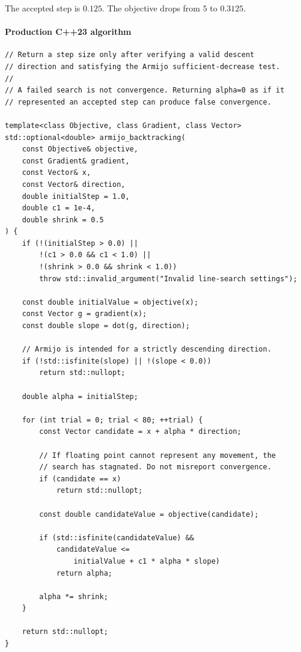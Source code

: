 The accepted step is \(0.125\). The objective drops from \(5\) to \(0.3125\).

\paragraph{Production C++23 algorithm}\label{02-foundations-ii-ch026-production-c23-algorithm}

\hypertarget{02-foundations-ii-ch026-production-c23-algorithm}{}

\begin{verbatim}
// Return a step size only after verifying a valid descent
// direction and satisfying the Armijo sufficient-decrease test.
//
// A failed search is not convergence. Returning alpha=0 as if it
// represented an accepted step can produce false convergence.

template<class Objective, class Gradient, class Vector>
std::optional<double> armijo_backtracking(
    const Objective& objective,
    const Gradient& gradient,
    const Vector& x,
    const Vector& direction,
    double initialStep = 1.0,
    double c1 = 1e-4,
    double shrink = 0.5
) {
    if (!(initialStep > 0.0) ||
        !(c1 > 0.0 && c1 < 1.0) ||
        !(shrink > 0.0 && shrink < 1.0))
        throw std::invalid_argument("Invalid line-search settings");

    const double initialValue = objective(x);
    const Vector g = gradient(x);
    const double slope = dot(g, direction);

    // Armijo is intended for a strictly descending direction.
    if (!std::isfinite(slope) || !(slope < 0.0))
        return std::nullopt;

    double alpha = initialStep;

    for (int trial = 0; trial < 80; ++trial) {
        const Vector candidate = x + alpha * direction;

        // If floating point cannot represent any movement, the
        // search has stagnated. Do not misreport convergence.
        if (candidate == x)
            return std::nullopt;

        const double candidateValue = objective(candidate);

        if (std::isfinite(candidateValue) &&
            candidateValue <=
                initialValue + c1 * alpha * slope)
            return alpha;

        alpha *= shrink;
    }

    return std::nullopt;
}
\end{verbatim}

